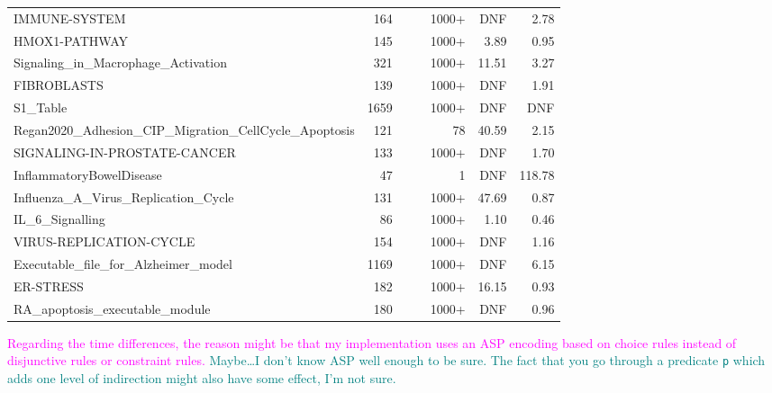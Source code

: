 \documentclass[runningheads]{llncs}
\newcommand{\vangiang}[1]{\textcolor{magenta}{#1}}
\newcommand{\sylvain}[1]{\textcolor{teal}{#1}}
\begin{document}
\begin{table}[!htb]
\begin{tabular}{lrrrrrr}
    IMMUNE-SYSTEM & 164 &&& 1000+ & DNF & 2.78\\
    HMOX1-PATHWAY & 145 &&& 1000+ & 3.89 & 0.95\\
    Signaling\_in\_Macrophage\_Activation & 321 &&& 1000+ & 11.51 & 3.27\\
    FIBROBLASTS & 139 &&& 1000+ & DNF & 1.91\\
    S1\_Table & 1659 &&& 1000+ & DNF & DNF\\
    Regan2020\_Adhesion\_CIP\_Migration\_CellCycle\_Apoptosis & 121 &&& 78 & 40.59 & 2.15\\
    SIGNALING-IN-PROSTATE-CANCER & 133 &&& 1000+ & DNF & 1.70\\
    InflammatoryBowelDisease & 47 &&& 1 & DNF & 118.78\\
    Influenza\_A\_Virus\_Replication\_Cycle & 131 &&& 1000+ & 47.69 & 0.87\\
    IL\_6\_Signalling & 86 &&& 1000+ & 1.10 & 0.46\\
    VIRUS-REPLICATION-CYCLE & 154 &&& 1000+ & DNF & 1.16\\
    Executable\_file\_for\_Alzheimer\_model & 1169 &&& 1000+ & DNF & 6.15\\
    ER-STRESS & 182 &&& 1000+ & 16.15 & 0.93\\
    RA\_apoptosis\_executable\_module & 180 &&& 1000+ & DNF & 0.96\\
    \bottomrule
  \end{tabular}
\end{table}

\vangiang{Regarding the time differences, the reason might be that my implementation uses an ASP encoding based on choice rules instead of disjunctive rules or constraint rules.}
\sylvain{Maybe\dots I don't know ASP well enough to be sure. The fact that you go through a predicate \texttt{p} which adds one level of indirection might also have some effect, I'm not sure.}
\end{document}
